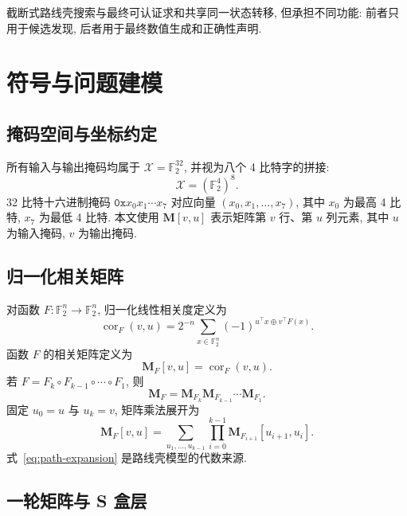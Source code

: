 \documentclass[UTF8,a4paper,zihao=-4,fontset=fandol]{ctexart}
\numberwithin{equation}{section}
\theoremstyle{definition}
\theoremstyle{plain}
\theoremstyle{remark}
\newcommand{\cor}{\operatorname{cor}}
\begin{document}
截断式路线壳搜索与最终可认证求和共享同一状态转移, 但承担不同功能: 前者只用于候选发现, 后者用于最终数值生成和正确性声明.

\section{符号与问题建模}

\subsection{掩码空间与坐标约定}

所有输入与输出掩码均属于 $\mathcal X=\mathbb F_2^{32}$, 并视为八个 4 比特字的拼接:
\begin{equation}
\mathcal X=(\mathbb F_2^4)^8.
\label{eq:mask-space}
\end{equation}
32 比特十六进制掩码 $\mathtt{0x}x_0x_1\cdots x_7$ 对应向量 $(x_0,x_1,\ldots,x_7)$, 其中 $x_0$ 为最高 4 比特, $x_7$ 为最低 4 比特. 本文使用 $\bm{M}[v,u]$ 表示矩阵第 $v$ 行、第 $u$ 列元素, 其中 $u$ 为输入掩码, $v$ 为输出掩码.

\subsection{归一化相关矩阵}

对函数 $F:\mathbb F_2^n\to\mathbb F_2^n$, 归一化线性相关度定义为
\begin{equation}
\cor_F(v,u)=2^{-n}\sum_{x\in\mathbb F_2^n}(-1)^{u^\top x\oplus v^\top F(x)}.
\label{eq:corr-def}
\end{equation}
函数 $F$ 的相关矩阵定义为
\begin{equation}
\bm{M}_F[v,u]=\cor_F(v,u).
\label{eq:corr-matrix}
\end{equation}
若 $F=F_k\circ F_{k-1}\circ\cdots\circ F_1$, 则
\begin{equation}
\bm{M}_F=\bm{M}_{F_k}\bm{M}_{F_{k-1}}\cdots\bm{M}_{F_1}.
\label{eq:composition}
\end{equation}
固定 $u_0=u$ 与 $u_k=v$, 矩阵乘法展开为
\begin{equation}
\bm{M}_F[v,u]=\sum_{u_1,\ldots,u_{k-1}}\prod_{i=0}^{k-1}\bm{M}_{F_{i+1}}[u_{i+1},u_i].
\label{eq:path-expansion}
\end{equation}
式~\eqref{eq:path-expansion} 是路线壳模型的代数来源.

\subsection{一轮矩阵与 S 盒层}
\end{document}
